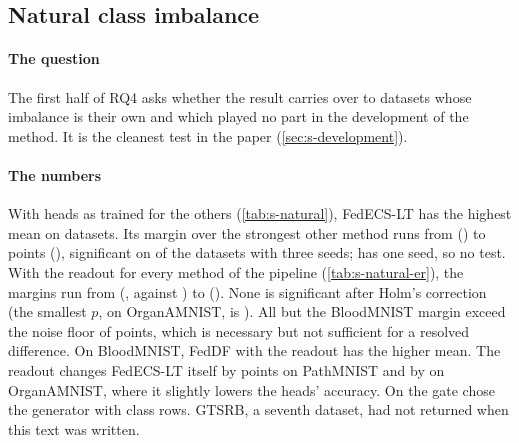 \subsection{Natural class imbalance}\label{sec:s-natural}

\paragraph{The question} The first half of RQ4 asks whether the result carries over to datasets whose imbalance is
their own and which played no part in the development of the method. It is the cleanest test in the paper
(\cref{sec:s-development}).

\begin{table}[t]
\centering\small
\caption{Balanced accuracy (\%) on the six naturally imbalanced datasets, the paper's natural-imbalance table;
FedECS-LT with its readout, other methods with heads as trained. A value without $\pm$ is from one seed. Look at the
gap between the first row and the rest.}
\label{tab:s-natural}
\end{table}

\begin{table}[t]
\centering\small
\caption{The same datasets with the exact readout for every method of the GeFL-F pipeline, from the paper's appendix.
Look at how close the rows are.}
\label{tab:s-natural-er}
\end{table}

\paragraph{The numbers} With heads as trained for the others (\cref{tab:s-natural}), FedECS-LT has the highest mean on
 datasets. Its margin over the strongest other method runs from 
() to  points (), significant on  of the
 datasets with three seeds;  has one seed, so no test. With the readout for every method
of the pipeline (\cref{tab:s-natural-er}), the margins run from  (, against
) to  (). None is significant after Holm's
correction (the smallest $p$, on OrganAMNIST, is ). All but the BloodMNIST margin
exceed the noise floor of  points, which is necessary but not sufficient for a resolved difference.
On BloodMNIST, FedDF with the readout has the higher mean. The readout changes FedECS-LT itself by
 points on PathMNIST and by  on OrganAMNIST,
where it slightly lowers the heads' accuracy. On  the gate chose the generator with class rows. GTSRB,
a seventh dataset, had not returned when this text was written.

